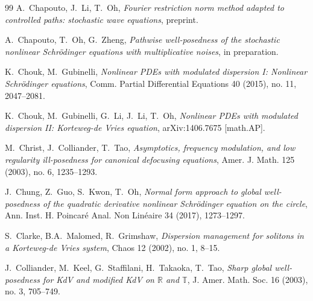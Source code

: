 \documentclass[letterpaper, 11pt,  reqno]{amsart}
\newcommand{\1}{\hspace{0.5mm}\text{I}\hspace{0.5mm}}
\newcommand{\R}{\mathbb{R}}
\newcommand{\T}{\mathbb{T}}
\numberwithin{equation}{section}
\numberwithin{theorem}{section}
\begin{document}
\begin{thebibliography}{99}
A.~Chapouto, J.~Li, T.~Oh, 
{\it  Fourier restriction norm method adapted to controlled paths:
stochastic wave equations},
preprint.






A.~Chapouto, T.~Oh, G.~Zheng,
{\it  Pathwise well-posedness of the stochastic nonlinear Schr\"odinger equations with multiplicative noises},
in preparation.


%



K.~Chouk, M.~Gubinelli, 
{\it Nonlinear PDEs with modulated dispersion I: Nonlinear Schr\"odinger equations},
Comm. Partial Differential Equations 40 (2015), no. 11, 2047--2081. 





K.~Chouk, M.~Gubinelli, G.~Li, J.~Li, T.~Oh, 
{\it Nonlinear PDEs with modulated dispersion II: Korteweg-de Vries equation}, 
arXiv:1406.7675 [math.AP].



%
%


M.~Christ, J.~Colliander, T.~Tao,
{\it Asymptotics, frequency modulation, and low regularity ill-posedness for canonical defocusing equations},
Amer. J. Math. 125 (2003), no. 6, 1235--1293.





J.~Chung, Z.~Guo, S.~Kwon, T.~Oh, 
{\it  Normal form approach to global well-posedness of the quadratic derivative nonlinear Schr\"odinger equation on the circle}, Ann. Inst. H. Poincar\'e Anal. Non Lin\'eaire 34 (2017), 1273--1297. 




S.~Clarke, B.A.~Malomed, R.~Grimshaw,
{\it Dispersion management for solitons in a Korteweg-de Vries system},
Chaos 12 (2002), no. 1, 8--15.




J.~Colliander, M.~Keel, G.~Staffilani, H.~Takaoka, T.~Tao,
{\it Sharp global well-posedness for KdV and modified KdV on $\R$ and $\T$},
J. Amer. Math. Soc. 16 (2003), no. 3, 705--749.





\end{thebibliography}
\end{document}
